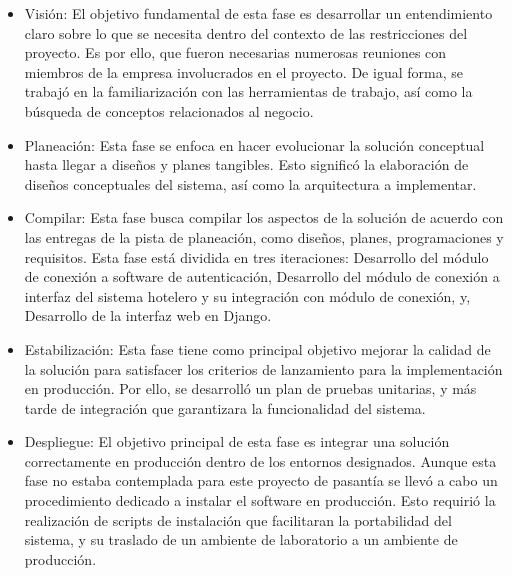 \begin{itemize}[noitemsep,nolistsep]
\item Visión: El objetivo fundamental de esta fase es desarrollar un entendimiento claro sobre lo que se necesita dentro del contexto de las restricciones del proyecto. Es por ello, que fueron necesarias numerosas reuniones con miembros de la empresa involucrados en el proyecto. De igual forma, se trabajó en la familiarización con las herramientas de trabajo, así como la búsqueda de conceptos relacionados al negocio.
\item Planeación: Esta fase se enfoca en hacer evolucionar la solución conceptual hasta llegar a diseños y planes tangibles. Esto significó la elaboración de diseños conceptuales del sistema, así como la arquitectura a implementar.
\item Compilar: Esta fase busca compilar los aspectos de la solución de acuerdo con las entregas de la pista de planeación, como diseños, planes, programaciones y requisitos. Esta fase está dividida en tres iteraciones: Desarrollo del módulo de conexión a software de autenticación, Desarrollo del módulo de conexión a interfaz del sistema hotelero y su integración con módulo de conexión, y, Desarrollo de la interfaz web en Django.
\item Estabilización: Esta fase tiene como principal objetivo mejorar la calidad de la solución para satisfacer los criterios de lanzamiento para la implementación en producción. Por ello, se desarrolló un plan de pruebas unitarias, y más tarde de integración que garantizara la funcionalidad del sistema.
\item Despliegue: El objetivo principal de esta fase es integrar una solución correctamente en producción dentro de los entornos designados. Aunque esta fase no estaba contemplada para este proyecto de pasantía se llevó a cabo un procedimiento dedicado a instalar el software en producción. Esto requirió la realización de scripts de instalación que facilitaran la portabilidad del sistema, y su traslado de un ambiente de laboratorio a un ambiente de producción.
\end{itemize}